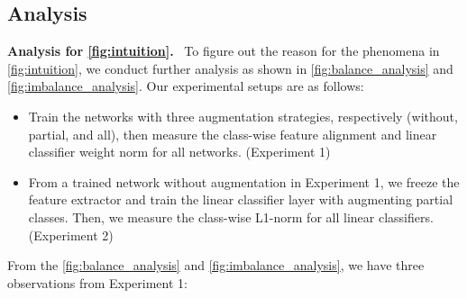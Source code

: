 \documentclass{article}
\newcommand{\myparagraph}[1]{\vspace{0.07cm}\noindent\textbf{#1}~}
\begin{document}
\subsection{Analysis}
\myparagraph{Analysis for \autoref{fig:intuition}.} To figure out the reason for the phenomena in \autoref{fig:intuition}, we conduct further analysis as shown in \autoref{fig:balance_analysis} and \autoref{fig:imbalance_analysis}. Our experimental setups are as follows:
\begin{itemize}
    \item Train the networks with three augmentation strategies, respectively (without, partial, and all), then measure the class-wise feature alignment and linear classifier weight norm for all networks. (Experiment 1)
    \item From a trained network without augmentation in Experiment 1, we freeze the feature extractor and train the linear classifier layer with augmenting partial classes. Then, we measure the class-wise L1-norm for all linear classifiers. (Experiment 2)
\end{itemize}
From the \autoref{fig:balance_analysis} and \autoref{fig:imbalance_analysis}, we have three observations from Experiment 1: 
\end{document}

